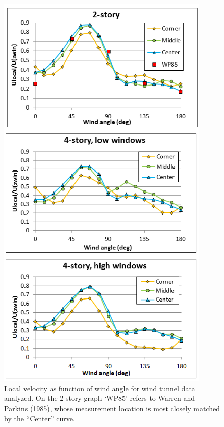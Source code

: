 \begin{figure}[hbtp] %
\centering
\includegraphics[width=0.9\textwidth, height=0.9\textheight, keepaspectratio=true]{media/ss-figure5.png}
\caption{Local velocity as function of wind angle for wind tunnel data analyzed. On the 2-story graph `WP85' refers to Warren and Parkins (1985), whose measurement location is most closely matched by the ``Center'' curve. \protect \label{fig:ss-pressure-network-two-openings}}
\end{figure}
%
